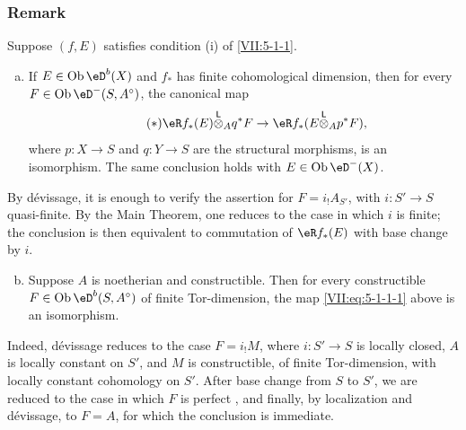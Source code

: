 \documentclass[12pt,oneside,english]{smfbook}
\DeclareMathOperator{\ob}{Ob}
\newcommand{\lotimes}{{\overset{\mathsf{L}}{\otimes}}}
\begin{document}
\subsubsection{Remark}\label{VII:5-1-2}

Suppose $(f,E)$ satisfies condition (i) of \ref{VII:5-1-1}.
\begin{enumerate}[a)]
  \item If $E\in\ob\eD^b(X)$ and $f_\ast$ has finite cohomological dimension, then for every $F\in\ob\eD^-(S,A^\circ)$, the canonical map
    \begin{equation*}\tag{$*$}\label{VII:eq:5-1-1-1}
      \eR f_\ast(E)\lotimes_A q^\ast F \to \eR f_\ast(E\lotimes_A p^\ast F) \text{,}
    \end{equation*}
    where $p:X\to S$ and $q:Y\to S$ are the structural morphisms, is an isomorphism. The same conclusion holds with $E\in\ob\eD^-(X)$.
\end{enumerate}

By dévissage, it is enough to verify the assertion for $F=i_!A_{S'}$, with $i:S'\to S$ quasi-finite. By the Main Theorem, one reduces to the case in which $i$ is finite; the conclusion is then equivalent to commutation of $\eR f_\ast(E)$ with base change by $i$.
\begin{enumerate}[a)]
\setcounter{enumi}{1}
  \item Suppose $A$ is noetherian and constructible. Then for every constructible $F\in\ob\eD^b(S,A^\circ)$ of finite Tor-dimension, the map \eqref{VII:eq:5-1-1-1} above is an isomorphism.
\end{enumerate}

Indeed, dévissage reduces to the case $F=i_!M$, where $i:S'\to S$ is locally closed, $A$ is locally constant on $S'$, and $M$ is constructible, of finite Tor-dimension, with locally constant cohomology on $S'$. After base change from $S$ to $S'$, we are reduced to the case in which $F$ is perfect \cite[I]{sga6}, and finally, by localization and dévissage, to $F=A$, for which the conclusion is immediate.

\subsubsection{}\label{VII:5-1-3}
\end{document}
